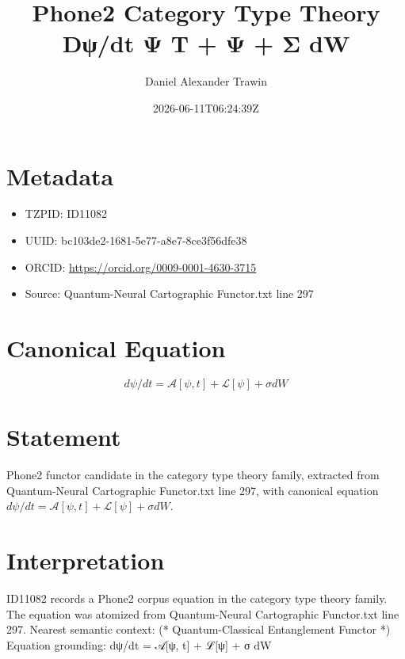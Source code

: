 \documentclass[11pt]{article}
\title{Phone2 Category Type Theory Dψ/dt Ψ T + Ψ + Σ dW}
\author{Daniel Alexander Trawin}
\date{2026-06-11T06:24:39Z}
\begin{document}
\maketitle
\section*{Metadata}
\begin{itemize}
\item TZPID: ID11082
\item UUID: bc103de2-1681-5e77-a8e7-8ce3f56dfe38
\item ORCID: \url{https://orcid.org/0009-0001-4630-3715}
\item Source: Quantum-Neural Cartographic Functor.txt line 297
\end{itemize}
\section*{Canonical Equation}
\[
dψ/dt = 𝒜[ψ, t] + ℒ[ψ] + σ dW
\]
\section*{Statement}
Phone2 functor candidate in the category type theory family, extracted from Quantum-Neural Cartographic Functor.txt line 297, with canonical equation $dψ/dt = 𝒜[ψ, t] + ℒ[ψ] + σ dW$.
\section*{Interpretation}
ID11082 records a Phone2 corpus equation in the category type theory family. The equation was atomized from Quantum-Neural Cartographic Functor.txt line 297. Nearest semantic context: (* Quantum-Classical Entanglement Functor *) Equation grounding: dψ/dt = 𝒜[ψ, t] + ℒ[ψ] + σ dW
\end{document}
